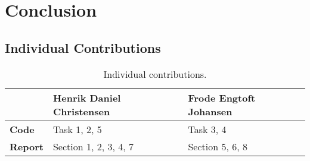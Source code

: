 \section{Conclusion}



\subsection{Individual Contributions}
\begin{table}[H]
    \centering
    \begin{tabular}{|l|l|l|}
    \hline
                    & \textbf{Henrik Daniel Christensen}    & \textbf{Frode Engtoft Johansen} \\ \hline
    \textbf{Code}   & Task 1, 2, 5                          & Task 3, 4\\ \hline
    \textbf{Report} & Section 1, 2, 3, 4, 7                 & Section 5, 6, 8 \\ \hline
    \end{tabular}
    \caption{Individual contributions.}
    \label{tab:individual_contributions}
\end{table}
